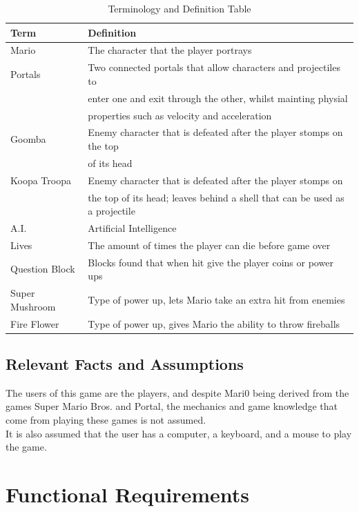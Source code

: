 \documentclass[12pt, titlepage]{article}
\begin{document}
\begin{table}
\caption{Terminology and Definition Table}
\begin{tabular}{l l}
\hline
Term			& Definition \\
\hline
Mario      		 & The character that the player portrays  \\
Portals      		 & Two connected portals that allow characters and projectiles to \\
			 & enter one and exit through the other, whilst mainting physial \\
			 & properties such as velocity and acceleration \\
Goomba		 & Enemy character that is defeated after the player stomps on the top \\
			 & of its head	  \\
Koopa Troopa	 & Enemy character that is defeated after the player stomps on \\
			 & the top of its head; leaves behind a shell that can be used as a projectile	\\
A.I.			 & Artificial Intelligence  \\
Lives			 & The amount of times the player can die before game over	\\
Question Block	 & Blocks found that when hit give the player coins or power ups	\\
Super Mushroom	 & Type of power up, lets Mario take an extra hit from enemies	\\
Fire Flower		 & Type of power up, gives Mario the ability to throw fireballs	\\
\hline
\end{tabular}
\end{table}

\subsection{Relevant Facts and Assumptions}

The users of this game are the players, and despite Mari0 being derived from the games Super Mario Bros. and Portal, the mechanics and game knowledge that come from playing these games is not assumed. \\
It is also assumed that the user has a computer, a keyboard, and a mouse to play the game.

\section{Functional Requirements}
\end{document}
